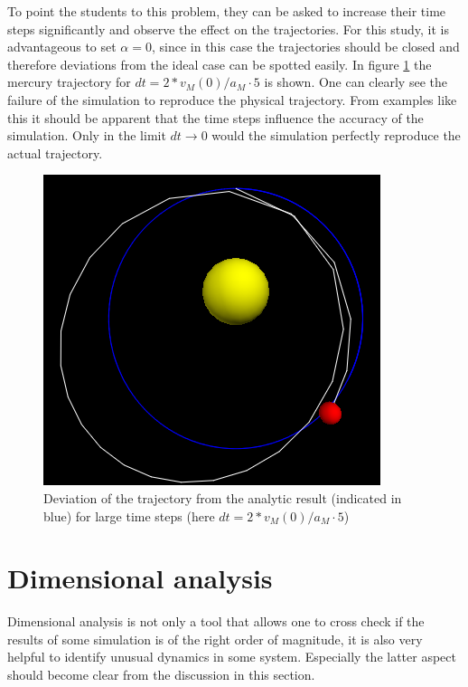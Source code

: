 \documentclass[12pt]{iopart}
\begin{document}
To point the students to this problem, they can be asked to increase their time steps significantly and observe the effect on the trajectories. For this study, it is advantageous to set $\alpha =0$, since in this case the trajectories should be closed and therefore deviations from the ideal case can be spotted easily. In figure \ref{fig: LargeDT} the mercury trajectory for $dt=2 * v_M(0) / a_M \cdot 5$ is shown. One can clearly see the failure of the simulation to reproduce the physical trajectory. From examples like this it should be apparent that the time steps influence the accuracy of the simulation. Only in the limit $dt \rightarrow 0$ would the simulation perfectly reproduce the actual trajectory.
\begin{figure}[htb]
	\centering
	\includegraphics[width=.3\textwidth]{figs/TrajectoryLargeDT.png}
	\caption{\label{fig: LargeDT} Deviation of the trajectory from the analytic result (indicated in blue) for large time steps (here $dt=2 * v_M(0) / a_M \cdot 5$)}
\end{figure}


\section{Dimensional analysis}\label{sec:analysis}

Dimensional analysis is not only a tool that allows one to cross check if the results of some simulation is
of the right order of magnitude, it is also very helpful to identify unusual dynamics in some system.
Especially the latter aspect should become clear from the discussion in this section.
\end{document}
